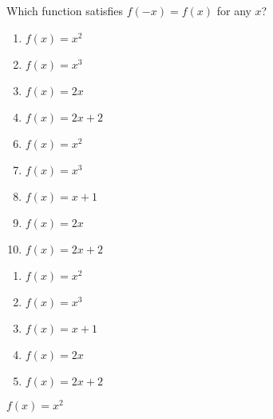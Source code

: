 



 Which function satisfies $f(-x)=f(x)$ for any $x$?


\ifsat
	\begin{enumerate}[label=\Alph*)]
		\item   $f(x)=x^{2}$%
		\item  $f(x)=x^{3}$
		\item  $f(x)=2x$
		\item  $f(x)=2x+2$
	\end{enumerate}
\else
\fi

\ifacteven
	\begin{enumerate}[label=\textbf{\Alph*.},itemsep=\fill,align=left]
		\setcounter{enumii}{5}
		\item   $f(x)=x^{2}$%
		\item  $f(x)=x^{3}$
		\item  $f(x)=x+1$
		\addtocounter{enumii}{1}
		\item  $f(x)=2x$
		\item  $f(x)=2x+2$
	\end{enumerate}
\else
\fi

\ifactodd
	\begin{enumerate}[label=\textbf{\Alph*.},itemsep=\fill,align=left]
		\item   $f(x)=x^{2}$%
		\item  $f(x)=x^{3}$
		\item  $f(x)=x+1$
		\item  $f(x)=2x$
		\item  $f(x)=2x+2$
	\end{enumerate}
\else
\fi

\ifgridin
   $f(x)=x^{2}$%
		
\else
\fi

